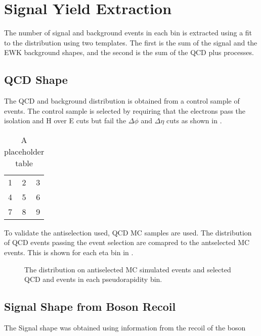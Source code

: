 \section{Signal Yield Extraction}

The number of signal and background events in each bin is extracted using a fit
to the \ETm distribution using two templates.
The first is the sum of the \Wenu signal and the \ac{EWK} background shapes,
and the second is the sum of the \ac{QCD} plus \gjet processes.

\subsection{\ac{QCD} \ETm Shape}

The \ac{QCD} and \gjet background distribution is obtained from a control sample of
events. The control sample is selected by requiring that the electrons pass the
isolation and H over E cuts but fail the $\Delta\phi$ and $\Delta\eta$ cuts as
shown in .

\begin{table}[htb]
  \centering
  \begin{tabular}{| l c r |}
    \hline
    1 & 2 & 3 \\
    4 & 5 & 6 \\
    7 & 8 & 9 \\
  \hline
  \end{tabular}
  \caption{A placeholder table}
  \label{asym36:antisel}
\end{table}

To validate the antiselection used, \ac{QCD} \ac{MC} samples are used. The
distribution of \ac{QCD} events passing the event selection are comapred to the
antselected MC events. This is shown for each eta bin in
.

\begin{figure}[htb]
  \centering
  \caption{The \ETm distribution on antiselected \ac{MC} simulated events
  and selected \ac{QCD} and \gjet events in each pseudorapidity bin.}
  \label{asym36:antiselclosure}
\end{figure}

\subsection{Signal \ETm Shape from Boson Recoil}

The Signal \ETm shape was obtained using information from the recoil of the
boson

